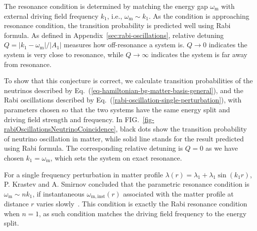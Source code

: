\documentclass[%
reprint,
 amsmath,amssymb,
 aps,
]{revtex4-1}
\begin{document}
The resonance condition is determined by matching the energy gap $\omega_{\mathrm m}$ with external driving field frequency $k_1$, i.e., $\omega_{\mathrm m} \sim k_1$. As the condition is approaching resonance condition, the transition probability is predicted well using Rabi formula. As defined in Appendix~\ref{sec:rabi-oscillations}, relative detuning $Q=\lvert k_1 - \omega_{\mathrm m} \rvert /\lvert A_1 \rvert$ measures how off-resonance a system is. $Q\to 0$ indicates the system is very close to resonance, while $Q\to \infty$ indicates the system is far away from resonance.


To show that this conjecture is correct, we calculate transition probabilities of the neutrinos described by Eq.~(\ref{eq-hamiltonian-bg-matter-basis-general}), and the Rabi oscillations described by Eq.~(\ref{rabi-oscillation-single-perturbation}), with parameters chosen so that the two systems have the same energy split and driving field strength and frequency. In FIG.~\ref{fig-rabiOscillationsNeutrinoCoincidence}, black dots show the transition probability of neutrino oscillation in matter, while solid line stands for the result predicted using Rabi formula. The corresponding relative detuning is $Q = 0$ as we have chosen $k_1=\omega_{\mathrm{m}}$, which sets the system on exact resonance.

For a single frequency perturbation in matter profile $\lambda(r) =\lambda_1 +  \lambda_1\sin(k_1 r)$, P. Krastev and A. Smirnov concluded that the parametric resonance condition is $\omega_{\mathrm{m}} \sim n k_1$, if instantaneous $\omega_{\mathrm{m,inst}}(r)$ associated with the matter profile at distance $r$ varies slowly~\cite{Krastev1989}. This condition is exactly the Rabi resonance condition when $n=1$, as such condition matches the driving field frequency to the energy split.
\end{document}

